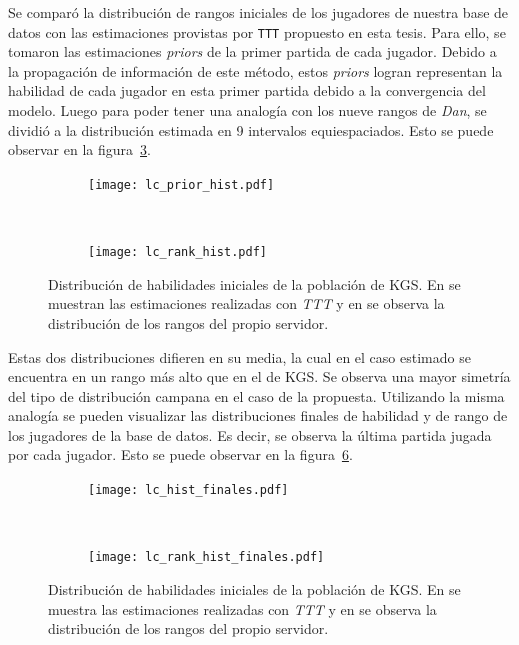 \documentclass[11pt,twoside,spanish]{report} %
\begin{document}
Se compar\'o la distribuci\'on de rangos iniciales de los jugadores de nuestra base de datos con las estimaciones provistas por \texttt{TTT} propuesto en esta tesis.
Para ello, se tomaron las estimaciones  \textit{priors} de la primer partida de cada jugador.
Debido a la propagaci\'on de informaci\'on de este m\'etodo, estos \textit{priors} logran representan la habilidad de cada jugador en esta primer partida debido a la convergencia del modelo.
Luego para poder tener una analog\'ia con los nueve rangos de \textit{Dan}, se dividi\'o a la distribuci\'on estimada en 9 intervalos equiespaciados.
Esto se puede observar en la figura~\ref{fig:hist_rank}.

\begin{figure}[H]
	\centering
	\begin{subfigure}[t]{.49\textwidth}
		\centering
		\texttt{[image: lc\_prior\_hist.pdf]}
		\caption{}
		\label{fig:hist_a}
	\end{subfigure}
	~
	\begin{subfigure}[t]{.49\textwidth}
		\centering
		\texttt{[image: lc\_rank\_hist.pdf]}
		\caption{}
		\label{fig:hist_b}
	\end{subfigure}
	\caption{Distribuci\'on de habilidades iniciales de la poblaci\'on de KGS. En  se muestran las estimaciones realizadas con \textit{TTT} y en   se observa la distribuci\'on de los rangos del propio servidor.}
	\label{fig:hist_rank}
\end{figure}

Estas dos distribuciones difieren en su media, la cual en el caso estimado se encuentra en un rango m\'as alto que en el de KGS.
Se observa una mayor simetr\'ia del tipo de distribuci\'on campana en el caso de la propuesta.
Utilizando la misma analog\'ia se pueden visualizar las distribuciones finales de habilidad y de rango de los jugadores de la base de datos.
Es decir, se observa la \'ultima partida jugada por cada jugador.
Esto se puede observar en la figura~\ref{fig:hist_rank_fin}.

\begin{figure}[H]
	\centering
	\begin{subfigure}[t]{.49\textwidth}
		\centering
		\texttt{[image: lc\_hist\_finales.pdf]}
		\caption{}
		\label{fig:hist_fin_a}
	\end{subfigure}
	~
	\begin{subfigure}[t]{.49\textwidth}
		\centering
		\texttt{[image: lc\_rank\_hist\_finales.pdf]}
		\caption{}
		\label{fig:hist_fin_b}
	\end{subfigure}
	\caption{Distribuci\'on de habilidades iniciales de la poblaci\'on de KGS. En  se muestra las estimaciones realizadas con \textit{TTT} y en  se observa la distribuci\'on de los rangos del propio servidor.}
	\label{fig:hist_rank_fin}
\end{figure}
\end{document}
